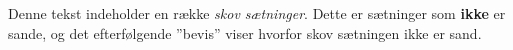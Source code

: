 Denne tekst indeholder en række \emph{skov sætninger}. Dette er sætninger som \textbf{ikke} er sande, og det efterfølgende ''bevis'' viser hvorfor skov sætningen ikke er sand.
